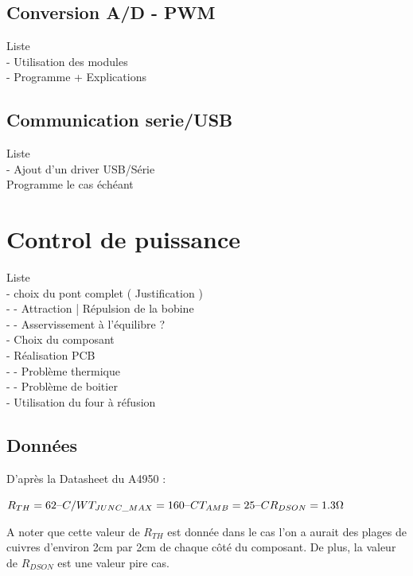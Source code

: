 \documentclass[11pt, french]{article} %
\begin{document}
\subsection{Conversion A/D - PWM}
Liste
\\- Utilisation des modules
\\- Programme + Explications

\subsection{Communication serie/USB}
Liste
\\- Ajout d'un driver USB/Série
\\ Programme le cas échéant

\section{Control de puissance}
Liste
\\- choix du pont complet ( Justification )
\\-  - Attraction | Répulsion de la bobine
\\-  - Asservissement à l'équilibre ?
\\- Choix du composant
\\- Réalisation PCB
\\-  - Problème thermique
\\-  - Problème de boitier
\\- Utilisation du four à réfusion

\subsection{Données}

\noindent
D'après la Datasheet du A4950 :

\vspace{0.5cm}

\noindent
$ 
R_{TH} = 62 \char123C/W  \\
T_{JUNC\_MAX} = 160 \char123C  \\
T_{AMB} = 25\char123C  \\
R_{DSON} = 1.3 \Omega  \\
$



\noindent
A noter que cette valeur de $R_{TH}$ est donnée dans le cas l'on a aurait des plages de cuivres d'environ 2cm par 2cm de chaque côté du composant. De plus, la valeur de $R_{DSON}$ est une valeur pire cas.
\end{document}
